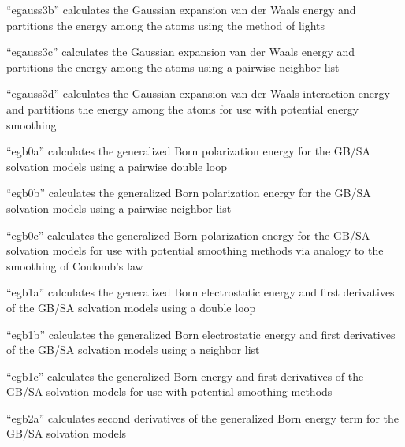 \documentclass[letterpaper,11pt,english]{sphinxmanual}
\begin{document}

“egauss3b” calculates the Gaussian expansion van der Waals
energy and partitions the energy among the atoms using the
method of lights


“egauss3c” calculates the Gaussian expansion van der Waals
energy and partitions the energy among the atoms using a
pairwise neighbor list


“egauss3d” calculates the Gaussian expansion van der Waals
interaction energy and partitions the energy among the atoms
for use with potential energy smoothing


“egb0a” calculates the generalized Born polarization energy
for the GB/SA solvation models using a pairwise double loop


“egb0b” calculates the generalized Born polarization energy
for the GB/SA solvation models using a pairwise neighbor list


“egb0c” calculates the generalized Born polarization energy
for the GB/SA solvation models for use with potential smoothing
methods via analogy to the smoothing of Coulomb’s law


“egb1a” calculates the generalized Born electrostatic energy
and first derivatives of the GB/SA solvation models using a
double loop


“egb1b” calculates the generalized Born electrostatic energy
and first derivatives of the GB/SA solvation models using a
neighbor list


“egb1c” calculates the generalized Born energy and first
derivatives of the GB/SA solvation models for use with
potential smoothing methods


“egb2a” calculates second derivatives of the generalized
Born energy term for the GB/SA solvation models

\end{document}
